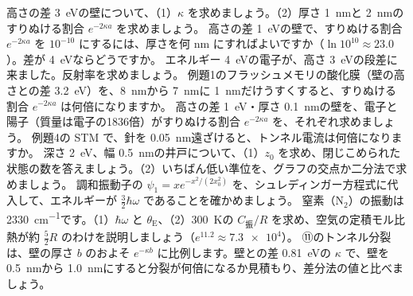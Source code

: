 \bkendproblems
{}
\bkproblem 高さの差 \qty{3}{eV}の壁について、（1）$\kappa$ を求めましょう。（2）厚さ \qty{1}{nm}と \qty{2}{nm}のすりぬける割合 $e^{-2\kappa a}$ を求めましょう。
\bkproblem 高さの差 \qty{1}{eV}の壁で、すりぬける割合 $e^{-2\kappa a}$ を $10^{-10}$ にするには、厚さを何 nm にすればよいですか（$\ln10^{10}\approx23.0$）。差が \qty{4}{eV}ならどうですか。
\bkproblem エネルギー \qty{4}{eV}の電子が、高さ \qty{3}{eV}の段差に来ました。反射率を求めましょう。
\bkproblem 例題1のフラッシュメモリの酸化膜（壁の高さとの差 \qty{3.2}{eV}）を、\qty{8}{nm}から \qty{7}{nm}に \qty{1}{nm}だけうすくすると、すりぬける割合 $e^{-2\kappa a}$ は何倍になりますか。
\bkproblem 高さの差 \qty{1}{eV}・厚さ \qty{0.1}{nm}の壁を、電子と陽子（質量は電子の1836倍）がすりぬける割合 $e^{-2\kappa a}$ を、それぞれ求めましょう。
\bkproblem 例題4の STM で、針を \qty{0.05}{nm}遠ざけると、トンネル電流は何倍になりますか。
\bkproblem 深さ \qty{2}{eV}、幅 \qty{0.5}{nm}の井戸について、（1）$z_0$ を求め、閉じこめられた状態の数を答えましょう。（2）いちばん低い準位を、グラフの交点か二分法で求めましょう。
\bkproblem 調和振動子の $\psi_1=xe^{-x^2/(2x_0^2)}$ を、シュレディンガー方程式に代入して、エネルギーが $\tfrac32\hbar\omega$ であることを確かめましょう。
\bkproblem 窒素（N$_2$）の振動は \qty{2330}{cm^{-1}}です。（1）$\hbar\omega$ と $\theta_{\mathrm E}$、（2）\qty{300}{K}の $C_{\text{振}}/R$ を求め、空気の定積モル比熱が約 $\tfrac52R$ のわけを説明しましょう（$e^{11.2}\approx\num{7.3e4}$）。
\bkproblem ⑪のトンネル分裂は、壁の厚さ $b$ のおよそ $e^{-\kappa b}$ に比例します。壁との差 \qty{0.81}{eV}の $\kappa$ で、壁を \qty{0.5}{nm}から \qty{1.0}{nm}にすると分裂が何倍になるか見積もり、差分法の値と比べましょう。


